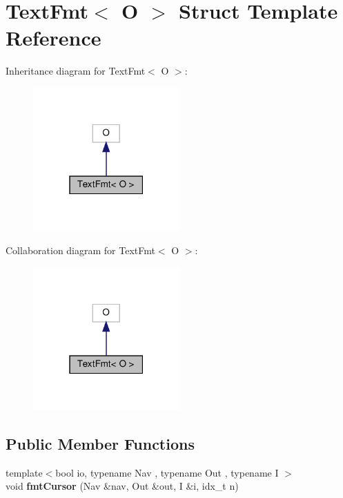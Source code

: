 \hypertarget{structTextFmt}{}\section{Text\+Fmt$<$ O $>$ Struct Template Reference}
\label{structTextFmt}


Inheritance diagram for Text\+Fmt$<$ O $>$\+:\nopagebreak
\begin{figure}[H]
\begin{center}
\leavevmode
\includegraphics[width=159pt]{structTextFmt__inherit__graph}
\end{center}
\end{figure}


Collaboration diagram for Text\+Fmt$<$ O $>$\+:\nopagebreak
\begin{figure}[H]
\begin{center}
\leavevmode
\includegraphics[width=159pt]{structTextFmt__coll__graph}
\end{center}
\end{figure}
\subsection*{Public Member Functions}
\begin{DoxyCompactItemize}
\item 
\mbox{\label{structTextFmt_a5a449272db2ae1fce810e0068b4c03c5}} 
{\footnotesize template$<$bool io, typename Nav , typename Out , typename I $>$ }\\void {\bfseries fmt\+Cursor} (Nav \&nav, Out \&out, I \&i, idx\+\_\+t n)
\end{DoxyCompactItemize}
